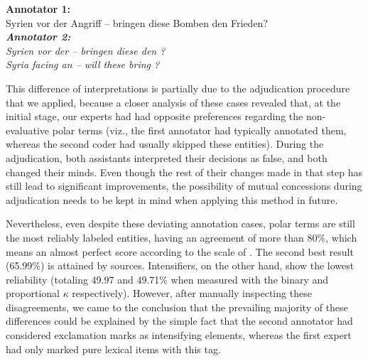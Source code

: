 { \renewcommand{\thesection}{\arabic{section}}
  \begin{example}\label{example:emo-disagr}
    \textbf{Annotator 1:}\\
    \upshape{}Syrien vor der Angriff -- bringen diese Bomben den Frieden?\\[0.8em]\itshape
    \textbf{Annotator 2:}\\
    \upshape{}Syrien vor der \emoexpression{\textcolor{red}{Angriff}}
    -- bringen diese \emoexpression{\textcolor{red}{Bomben}} den
    \emoexpression{\textcolor{red}{Frieden}}?\\[0.8em]

    \noindent\itshape{}Syria facing an
    \upshape{}\itshape{}
    -- will these
    \upshape{}\itshape{}
    bring
    \upshape{}\itshape{}?
  \end{example}
}

This difference of interpretations is partially due to the
adjudication procedure that we applied, because a closer analysis of
these cases revealed that, at the initial stage, our experts had had
opposite preferences regarding the non-evaluative polar terms (viz.,
the first annotator had typically annotated them, whereas the second
coder had usually skipped these entities).  During the adjudication,
both assistants interpreted their decisions as false, and both changed
their minds.  Even though the rest of their changes made in that step
has still lead to significant improvements, the possibility of mutual
concessions during adjudication needs to be kept in mind when applying
this method in future.

Nevertheless, even despite these deviating annotation cases, polar
terms are still the most reliably labeled entities, having an
agreement of more than $80\%$, which means an almost perfect score
according to the scale of \citet{Landis:77}.  The second best result
(65.99\%) is attained by sources.  Intensifiers, on the other hand,
show the lowest reliability (totaling 49.97 and 49.71\% when measured
with the binary and proportional $\kappa$ respectively).  However,
after manually inspecting these disagreements, we came to the
conclusion that the prevailing majority of these differences could be
explained by the simple fact that the second annotator had considered
exclamation marks as intensifying elements, whereas the first expert
had only marked pure lexical items with this tag.

